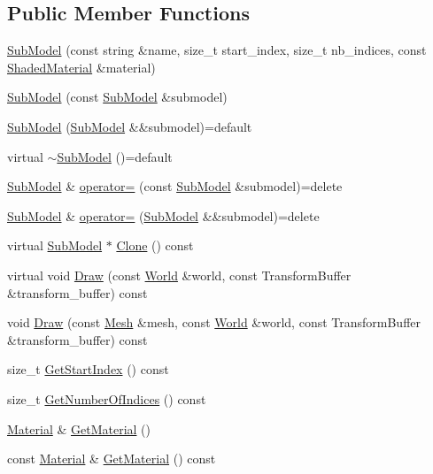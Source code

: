 \subsection*{Public Member Functions}
\begin{DoxyCompactItemize}
\item 
\hyperlink{classmage_1_1_sub_model_a26dce7b076af1edb4209d0a236a250ef}{Sub\+Model} (const string \&name, size\+\_\+t start\+\_\+index, size\+\_\+t nb\+\_\+indices, const \hyperlink{structmage_1_1_shaded_material}{Shaded\+Material} \&material)
\item 
\hyperlink{classmage_1_1_sub_model_ae71dcb72fc1b06710b390c97a2db1d68}{Sub\+Model} (const \hyperlink{classmage_1_1_sub_model}{Sub\+Model} \&submodel)
\item 
\hyperlink{classmage_1_1_sub_model_a6b4b972e0740af607113aae0418e370e}{Sub\+Model} (\hyperlink{classmage_1_1_sub_model}{Sub\+Model} \&\&submodel)=default
\item 
virtual \hyperlink{classmage_1_1_sub_model_a75853fd4a6435f074f13eab9c73b695b}{$\sim$\+Sub\+Model} ()=default
\item 
\hyperlink{classmage_1_1_sub_model}{Sub\+Model} \& \hyperlink{classmage_1_1_sub_model_aafc8b4ba509ec78ea36719e98b1a0c99}{operator=} (const \hyperlink{classmage_1_1_sub_model}{Sub\+Model} \&submodel)=delete
\item 
\hyperlink{classmage_1_1_sub_model}{Sub\+Model} \& \hyperlink{classmage_1_1_sub_model_a616b8007e767deebc248485fb8d26773}{operator=} (\hyperlink{classmage_1_1_sub_model}{Sub\+Model} \&\&submodel)=delete
\item 
virtual \hyperlink{classmage_1_1_sub_model}{Sub\+Model} $\ast$ \hyperlink{classmage_1_1_sub_model_a368bcc2ee819cc29ec0203e314ae91d3}{Clone} () const
\item 
virtual void \hyperlink{classmage_1_1_sub_model_a2fa14949edacbe995749f4b05bdc3cf5}{Draw} (const \hyperlink{classmage_1_1_world}{World} \&world, const Transform\+Buffer \&transform\+\_\+buffer) const
\item 
void \hyperlink{classmage_1_1_sub_model_a16400e2d0cc14a38fba18971e227d2ee}{Draw} (const \hyperlink{classmage_1_1_mesh}{Mesh} \&mesh, const \hyperlink{classmage_1_1_world}{World} \&world, const Transform\+Buffer \&transform\+\_\+buffer) const
\item 
size\+\_\+t \hyperlink{classmage_1_1_sub_model_a2b901cb62dca26a7ff399719e0a4ba66}{Get\+Start\+Index} () const
\item 
size\+\_\+t \hyperlink{classmage_1_1_sub_model_a18736678fc1a5d882776298053e037b3}{Get\+Number\+Of\+Indices} () const
\item 
\hyperlink{structmage_1_1_material}{Material} \& \hyperlink{classmage_1_1_sub_model_a8487b28be21ae182cd97c61325b2b478}{Get\+Material} ()
\item 
const \hyperlink{structmage_1_1_material}{Material} \& \hyperlink{classmage_1_1_sub_model_ab9e1c661e94a2ac0d819ad5d36a18a4c}{Get\+Material} () const
\end{DoxyCompactItemize}
